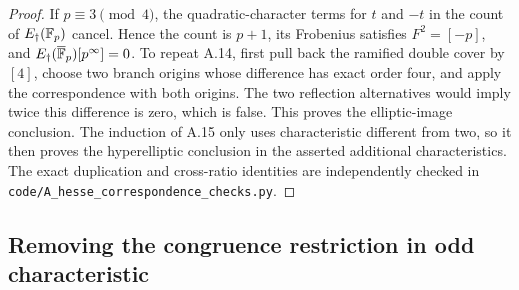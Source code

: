 \begin{proof}
If $p\equiv3\pmod4$, the quadratic-character terms for $t$ and
$-t$ in the count of $E_\dagger(\mathbb F_p)$ cancel. Hence the
count is $p+1$, its Frobenius satisfies $F^2=[-p]$, and
$E_\dagger(\overline{\mathbb F}_p)[p^\infty]=0$. To repeat A.14,
first pull back the ramified double cover by $[4]$, choose two
branch origins whose difference has exact order four, and
apply the correspondence with both origins. The two reflection
alternatives would imply twice this difference is zero, which
is false. This proves the elliptic-image conclusion. The
induction of A.15 only uses characteristic different from two,
so it then proves the hyperelliptic conclusion in the asserted
additional characteristics. The exact duplication and
cross-ratio identities are independently checked in
\texttt{code/A\_hesse\_correspondence\_checks.py}.
\end{proof}

\subsection{Removing the congruence restriction in odd characteristic}

